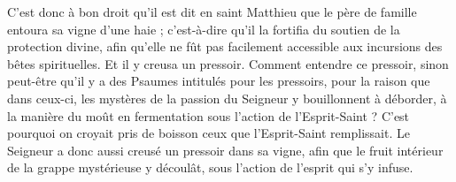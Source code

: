 C'est donc à bon droit qu’il est dit en saint Matthieu que le père de famille entoura sa vigne d'une haie ; c’est-à-dire qu’il la fortifia du soutien de la protection divine, afin qu’elle ne fût pas facilement accessible aux incursions des bêtes spirituelles. Et il y creusa un pressoir. Comment entendre ce pressoir, sinon peut-être qu’il y a des Psaumes intitulés pour les pressoirs, pour la raison que dans ceux-ci, les mystères de la passion du Seigneur y bouillonnent à déborder, à la manière du moût en fermentation sous l’action de l’Esprit-Saint ? C’est pourquoi on croyait pris de boisson ceux que l’Esprit-Saint remplissait. Le Seigneur a donc aussi creusé un pressoir dans sa vigne, afin que le fruit intérieur de la grappe mystérieuse y découlât, sous l’action de l’esprit qui s’y infuse.
